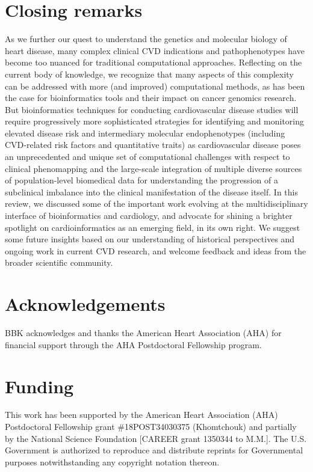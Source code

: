 \documentclass[letter]{bioinfo}
\begin{document}
	\section*{Closing remarks}
	As we further our quest to understand the genetics and molecular biology of heart disease, many complex clinical CVD indications and pathophenotypes have become too nuanced for traditional computational approaches. Reflecting on the current body of knowledge, we recognize that many aspects of this complexity can be addressed with more (and improved) computational methods, as has been the case for bioinformatics tools and their impact on cancer genomics research.  But bioinformatics techniques for conducting cardiovascular disease studies will require progressively more sophisticated strategies for identifying and monitoring elevated disease risk and intermediary molecular endophenotypes (including CVD-related risk factors and quantitative traits) as cardiovascular disease poses an unprecedented and unique set of computational challenges with respect to clinical phenomapping and the large-scale integration of multiple diverse sources of population-level biomedical data for understanding the progression of a subclinical imbalance into the clinical manifestation of the disease itself.  In this review, we discussed some of the important work evolving at the multidisciplinary interface of bioinformatics and cardiology, and advocate for shining a brighter spotlight on cardioinformatics as an emerging field, in its own right.  We suggest some future insights based on our understanding of historical perspectives and ongoing work in current CVD research, and welcome feedback and ideas from the broader scientific community.

	\enlargethispage{12pt}
	
	
	
	
	\section*{Acknowledgements}
	
	BBK acknowledges and thanks the American Heart Association (AHA) for financial support through the AHA Postdoctoral Fellowship program.
	\vspace*{-12pt}
	
	\section*{Funding}
	
	This work has been supported by the American Heart Association (AHA) Postdoctoral Fellowship grant \#18POST34030375 (Khomtchouk) and partially by the National Science Foundation [CAREER grant 1350344 to M.M.]. The U.S. Government is authorized to reproduce and distribute reprints for Governmental purposes notwithstanding any copyright notation thereon.\vspace*{-12pt}
	
\end{document}
